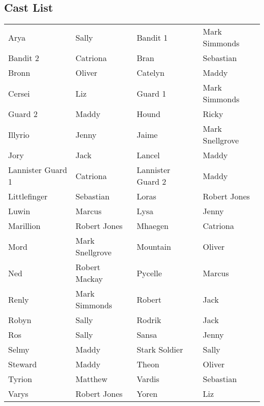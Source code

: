 \subsection*{Cast List}
\begin{tabular}{ll|ll}\\
Arya & Sally &  Bandit 1 & Mark Simmonds\\
Bandit 2 & Catriona &  Bran & Sebastian\\
Bronn & Oliver &  Catelyn & Maddy\\
Cersei & Liz &  Guard 1 & Mark Simmonds\\
Guard 2 & Maddy &  Hound & Ricky\\
Illyrio & Jenny &  Jaime & Mark Snellgrove\\
Jory & Jack &  Lancel & Maddy\\
Lannister Guard 1 & Catriona &  Lannister Guard 2 & Maddy\\
Littlefinger & Sebastian &  Loras & Robert Jones\\
Luwin & Marcus &  Lysa & Jenny\\
Marillion & Robert Jones &  Mhaegen & Catriona\\
Mord & Mark Snellgrove &  Mountain & Oliver\\
Ned & Robert Mackay &  Pycelle & Marcus\\
Renly & Mark Simmonds &  Robert & Jack\\
Robyn & Sally &  Rodrik & Jack\\
Ros & Sally &  Sansa & Jenny\\
Selmy & Maddy &  Stark Soldier & Sally\\
Steward & Maddy &  Theon & Oliver\\
Tyrion & Matthew &  Vardis & Sebastian\\
Varys & Robert Jones &  Yoren & Liz\\
\end{tabular}
